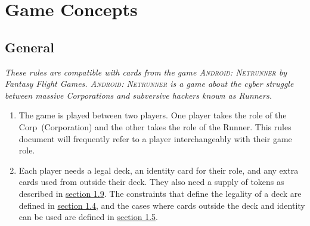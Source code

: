\section{Game Concepts}\label{sec:game_concepts}
\subsection{General}
\textit{These rules are compatible with cards from the game \textsc{Android: Netrunner} by Fantasy Flight Games. \textsc{Android: Netrunner} is a game about the cyber struggle between massive Corporations and subversive hackers known as Runners.}
\begin{enumerate}
	\item The game is played between two players. One player takes the role of the Corp~(Corporation) and the other takes the role of the Runner. This rules document will frequently refer to a player interchangeably with their game role.
	\item Each player needs a legal deck, an identity card for their role, and any extra cards used	from outside their deck. They also need a supply of tokens as described in \hyperlink{page.i}{section 1.9}.	The constraints that define the legality of a deck are defined in \hyperlink{page.i}{section 1.4}, and the cases where cards outside the deck and identity can be used are defined in \hyperlink{page.i}{section 1.5}.
\end{enumerate}
